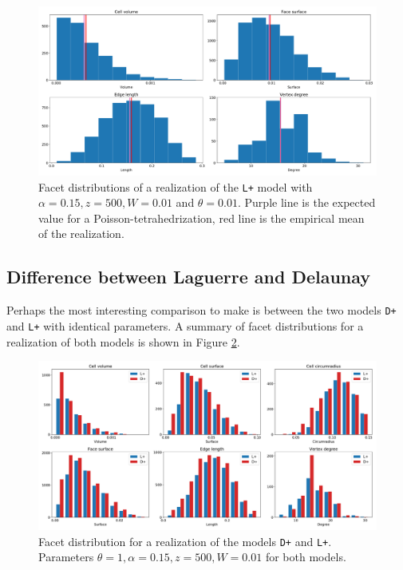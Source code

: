 \begin{figure}
  \centering
    \includegraphics[width=1\textwidth]{../img/numeric/poisson.pdf}
  \caption{Facet distributions of a realization of the \texttt{L+} model with $\alpha=0.15,z=500,W=0.01$ and $\theta = 0.01$. Purple line is the expected value for a Poisson-tetrahedrization, red line is the empirical mean of the realization.  }
  \label{fig:PoisvsGibbs}
\end{figure}




\subsection{Difference between Laguerre and Delaunay}
Perhaps the most interesting comparison to make is between the two models \texttt{D+} and \texttt{L+} with identical parameters. A summary of facet distributions for a realization of both models is shown in Figure  \ref{fig:DelvsLag}.


\begin{figure}
  \centering
    \includegraphics[width=1\textwidth]{../img/numeric/facets_L+_D+.pdf}
  \caption{Facet distribution for a realization of the models \texttt{D+} and \texttt{L+}. Parameters $\theta = 1,\alpha = 0.15, z=500, W=0.01$ for both models.}
  \label{fig:DelvsLag}
\end{figure}


